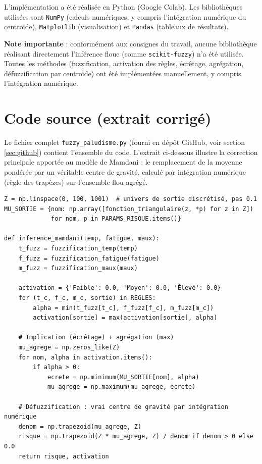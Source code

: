 \documentclass[a4paper,12pt]{report} %
\begin{document}
L'implémentation a été réalisée en Python (Google Colab). Les bibliothèques utilisées sont \texttt{NumPy} (calculs numériques, y compris l'intégration numérique du centroïde), \texttt{Matplotlib} (visualisation) et \texttt{Pandas} (tableaux de résultats).

\textbf{Note importante} : conformément aux consignes du travail, aucune bibliothèque réalisant directement l'inférence floue (comme \texttt{scikit-fuzzy}) n'a été utilisée. Toutes les méthodes (fuzzification, activation des règles, écrêtage, agrégation, défuzzification par centroïde) ont été implémentées manuellement, y compris l'intégration numérique.

\section{Code source (extrait corrigé)}

Le fichier complet \texttt{fuzzy\_paludisme.py} (fourni en dépôt GitHub, voir section \ref{sec:github}) contient l'ensemble du code. L'extrait ci-dessous illustre la correction principale apportée au modèle de Mamdani : le remplacement de la moyenne pondérée par un véritable centre de gravité, calculé par intégration numérique (règle des trapèzes) sur l'ensemble flou agrégé.

\begin{verbatim}
Z = np.linspace(0, 100, 1001)  # univers de sortie discrétisé, pas 0.1
MU_SORTIE = {nom: np.array([fonction_triangulaire(z, *p) for z in Z])
             for nom, p in PARAMS_RISQUE.items()}

def inference_mamdani(temp, fatigue, maux):
    t_fuzz = fuzzification_temp(temp)
    f_fuzz = fuzzification_fatigue(fatigue)
    m_fuzz = fuzzification_maux(maux)

    activation = {'Faible': 0.0, 'Moyen': 0.0, 'Élevé': 0.0}
    for (t_c, f_c, m_c, sortie) in REGLES:
        alpha = min(t_fuzz[t_c], f_fuzz[f_c], m_fuzz[m_c])
        activation[sortie] = max(activation[sortie], alpha)

    # Implication (écrêtage) + agrégation (max)
    mu_agrege = np.zeros_like(Z)
    for nom, alpha in activation.items():
        if alpha > 0:
            ecrete = np.minimum(MU_SORTIE[nom], alpha)
            mu_agrege = np.maximum(mu_agrege, ecrete)

    # Défuzzification : vrai centre de gravité par intégration numérique
    denom = np.trapezoid(mu_agrege, Z)
    risque = np.trapezoid(Z * mu_agrege, Z) / denom if denom > 0 else 0.0
    return risque, activation
\end{verbatim}
\end{document}
